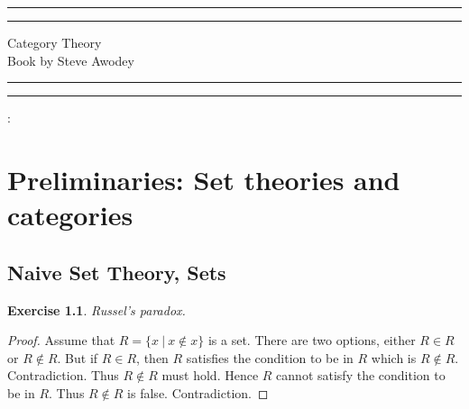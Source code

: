 \documentclass[a4paper, 11pt]{book}
\theoremstyle{plain}
\newtheorem{exercise}[theorem]{Exercise}
\theoremstyle{plain}
\begin{document}
  \begin{titlepage}
	\centering %
	\scshape %
	\vspace*{1.5\baselineskip} %

	\rule{13cm}{1.6pt}\vspace*{-\baselineskip}\vspace*{2pt} %
	\rule{13cm}{0.4pt} %
	
		\vspace{0.75\baselineskip} %
	{	\Huge Category Theory\\ 
			\vspace{4mm}
		Book by Steve Awodey \\	}
		\vspace{0.75\baselineskip} %
	\rule{13cm}{0.4pt}\vspace*{-\baselineskip}\vspace{3.2pt} %
	\rule{13cm}{1.6pt} %
	
		\vspace{1.75\baselineskip} %
	{\large : 
		\vspace*{1.2\baselineskip}
	} \\
	\vfill

\end{titlepage}
\begingroup
\let\cleardoublepage\clearpage
\tableofcontents
\endgroup


\chapter{Preliminaries: Set theories and categories}
  \section{Naive Set Theory, Sets}
  \begin{exercise}
  Russel's paradox.
  \end{exercise}
  \begin{proof}
  Assume that $R = \{x~\vert~x\notin x\}$ is a set. There are two options, either $R\in R$ or $R\notin R$. But if $R\in R$, then $R$ satisfies the condition to be in $R$ which is $R\notin R$. Contradiction. Thus $R\notin R$ must hold. Hence $R$ cannot satisfy the condition to be in $R$. Thus $R\notin R$ is false. Contradiction.
\end{proof}
  
\end{document}
